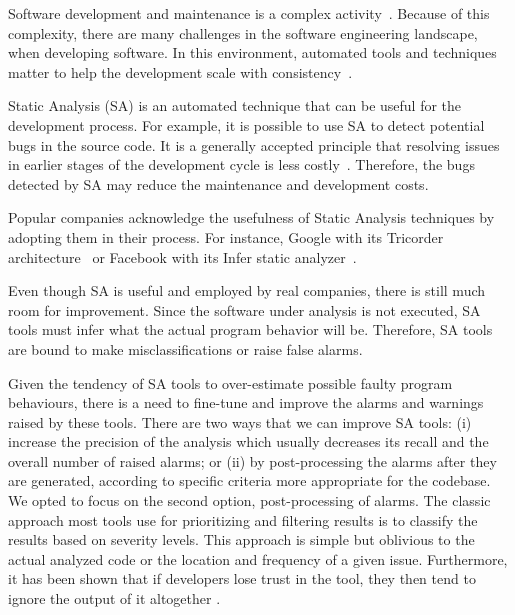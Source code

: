 Software development and maintenance is a complex activity~\cite{clarke2016}. Because of this complexity, there are many challenges in the software engineering landscape, when developing software. In this environment, automated tools and techniques matter to help the development scale with consistency~\cite{winters2020}. 

Static Analysis (SA) is an automated technique that can be useful for the development process. For example, it is possible to use SA to detect potential bugs in the source code. It is a generally accepted principle that resolving issues in earlier stages of the development cycle is less costly~\cite{dawson2010}. Therefore, the bugs detected by SA may reduce the maintenance and development costs.

Popular companies acknowledge the usefulness of Static Analysis techniques by adopting them in their process. For instance, Google with its Tricorder architecture~\cite{sa_google} or Facebook with its Infer static analyzer~\cite{infer}.



Even though SA is useful and employed by real companies, there is still much room for improvement. Since the software under analysis is not executed, SA tools must infer what the actual program behavior will be. Therefore, SA tools are bound to make misclassifications or raise false alarms.

Given the tendency of SA tools to over-estimate possible faulty program behaviours, there is a need to fine-tune and improve the alarms and warnings raised by these tools. There are two ways that we can improve SA tools: (i) increase the precision of the analysis which usually decreases its recall and the overall number of raised alarms; or (ii) by post-processing the alarms after they are generated, according to specific criteria more appropriate for the codebase. We opted to focus on the second option, post-processing of alarms. 
The classic approach most tools use for prioritizing and filtering results is to classify the results based on severity levels. This approach is simple but oblivious to the actual analyzed code or the location and frequency of a given issue. Furthermore, it has been shown that if developers lose trust in the tool, they then tend to ignore the output of it altogether \cite{sa_google}.

